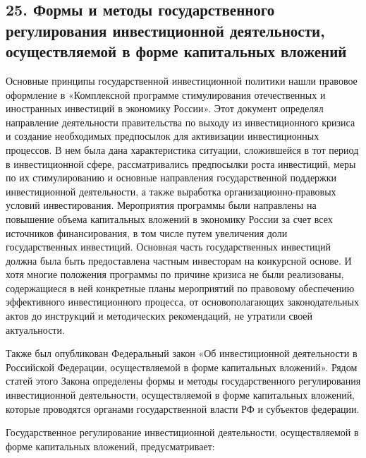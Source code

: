 \subsection*{25. Формы и методы государственного регулирования инвестиционной деятельности, осуществляемой в форме капитальных вложений}

Основные принципы государственной инвестиционной политики нашли правовое оформление в «Комплексной программе стимулирования отечественных и иностранных инвестиций в экономику России». Этот документ определял направление деятельности правительства по выходу из инвестиционного кризиса и создание необходимых предпосылок для активизации инвестиционных процессов. В нем была дана характеристика ситуации, сложившейся в тот период в инвестиционной сфере, рассматривались предпосылки роста инвестиций, меры по их стимулированию и основные направления государственной поддержки инвестиционной деятельности, а также выработка организационно-правовых условий инвестирования.
Мероприятия программы были направлены на повышение объема капитальных вложений в экономику России за счет всех источников финансирования, в том числе путем увеличения доли государственных инвестиций. Основная часть государственных инвестиций должна была быть предоставлена частным инвесторам на конкурсной основе. И хотя многие положения программы по причине кризиса не были реализованы, содержащиеся в ней конкретные планы мероприятий по правовому обеспечению эффективного инвестиционного процесса, от основополагающих законодательных актов до инструкций и методических рекомендаций, не утратили своей актуальности.

Также был опубликован Федеральный закон «Об инвестиционной деятельности в Российской Федерации, осуществляемой в форме капитальных вложений». Рядом статей этого Закона определены формы и методы государственного регулирования инвестиционной деятельности, осуществляемой в форме капитальных вложений, которые проводятся органами государственной власти РФ и субъектов федерации.

Государственное регулирование инвестиционной деятельности, осуществляемой в форме капитальных вложений, предусматривает:

